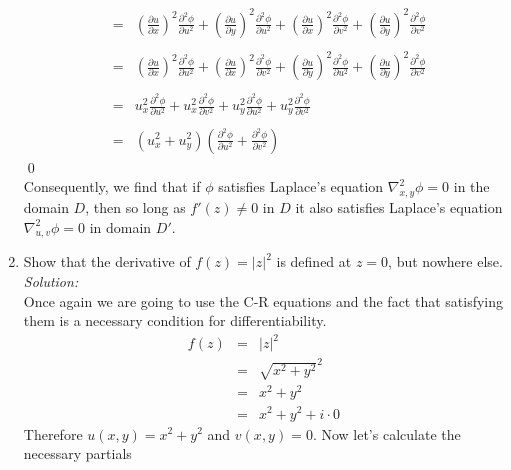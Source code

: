 \documentclass[10pt]{amsart}
\theoremstyle{nonumberplain}
\begin{document}
\begin{enumerate}[label={\bf {\arabic*}:}]
\begin{eqnarray*}
												&=& \left(\frac{\partial u}{\partial x}\right)^2 \frac{\partial^2 \phi}{\partial u^2}
												        	 + \left(\frac{\partial u}{\partial y}\right)^2 \frac{\partial^2 \phi}{\partial u^2}
													 + \left(\frac{\partial u}{\partial x}\right)^2 \frac{\partial^2 \phi}{\partial v^2} 
													 + \left(\frac{\partial u}{\partial y}\right)^2\frac{\partial^2 \phi}{\partial v^2} \\ \\
												&=& \left(\frac{\partial u}{\partial x}\right)^2 \frac{\partial^2 \phi}{\partial u^2}
													+ \left(\frac{\partial u}{\partial x}\right)^2 \frac{\partial^2 \phi}{\partial v^2}
												        	 + \left(\frac{\partial u}{\partial y}\right)^2 \frac{\partial^2 \phi}{\partial u^2}												  
													 + \left(\frac{\partial u}{\partial y}\right)^2\frac{\partial^2 \phi}{\partial v^2} \\ \\
												&=& u_x^2\frac{\partial^2\phi}{\partial u^2}
													+ u_x^2\frac{\partial^2 \phi }{\partial v^2}
													+ u_y^2\frac{\partial^2\phi}{\partial u^2}
													+ u_y^2\frac{\partial^2 \phi }{\partial v^2} \\ \\
												&=& \left(u_x^2 + u_y^2\right) \left(\frac{\partial^2\phi}{\partial u^2} + \frac{\partial^2 \phi }{\partial v^2}\right)
\end{eqnarray*}
\qed \\
\noindent
Consequently, we find that if $\phi$ satisfies Laplace's equation $\nabla_{x, y}^2 \phi = 0$ in the domain $D$,
then so long as $f'(z) \neq 0$ in $D$ it also satisfies Laplace's equation $\nabla_{u, v}^2 \phi = 0$ in domain $D'$. \\
\item Show that the derivative of $f(z)=|z|^2$ is defined at $z=0$, but nowhere else.\\
\textit{Solution:} \\
Once again we are going to use the C-R equations and the fact that satisfying them is a necessary condition for differentiability.
\begin{eqnarray*}
f(z) &=&|z|^2 \\
      &=&\sqrt{x^2 + y^2}^2 \\
      &=& x^2 + y^2 \\
      &=& x^2 + y^2 + i \cdot 0
\end{eqnarray*}
Therefore $u(x, y) = x^2 + y^2$ and $v(x, y) = 0$. Now let's calculate the necessary partials

\end{enumerate}
\end{document}
